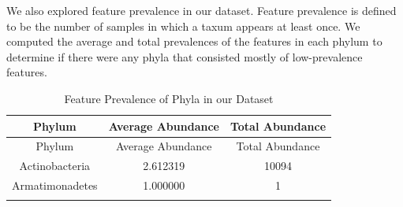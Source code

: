\documentclass[12pt,twoside]{dukestatscithesis}
\begin{document}
We also explored feature prevalence in our dataset. Feature prevalence
is defined to be the number of samples in which a taxum appears at least
once. We computed the average and total prevalences of the features in
each phylum to determine if there were any phyla that consisted mostly
of low-prevalence features.
\begin{longtable}[]{@{}ccc@{}}
\caption{Feature Prevalence of Phyla in our Dataset}\tabularnewline
\toprule
\begin{minipage}[b]{0.35\columnwidth}\centering\strut
Phylum\strut
\end{minipage} & \begin{minipage}[b]{0.28\columnwidth}\centering\strut
Average Abundance\strut
\end{minipage} & \begin{minipage}[b]{0.28\columnwidth}\centering\strut
Total Abundance\strut
\end{minipage}\tabularnewline
\midrule
\endfirsthead
\toprule
\begin{minipage}[b]{0.35\columnwidth}\centering\strut
Phylum\strut
\end{minipage} & \begin{minipage}[b]{0.28\columnwidth}\centering\strut
Average Abundance\strut
\end{minipage} & \begin{minipage}[b]{0.28\columnwidth}\centering\strut
Total Abundance\strut
\end{minipage}\tabularnewline
\midrule
\endhead
\begin{minipage}[t]{0.35\columnwidth}\centering\strut
Actinobacteria\strut
\end{minipage} & \begin{minipage}[t]{0.28\columnwidth}\centering\strut
2.612319\strut
\end{minipage} & \begin{minipage}[t]{0.28\columnwidth}\centering\strut
10094\strut
\end{minipage}\tabularnewline
\begin{minipage}[t]{0.35\columnwidth}\centering\strut
Armatimonadetes\strut
\end{minipage} & \begin{minipage}[t]{0.28\columnwidth}\centering\strut
1.000000\strut
\end{minipage} & \begin{minipage}[t]{0.28\columnwidth}\centering\strut
1\strut
\end{minipage}\tabularnewline
\begin{minipage}[t]{0.35\columnwidth}\centering\strut

\end{minipage}
\end{longtable}
\end{document}
